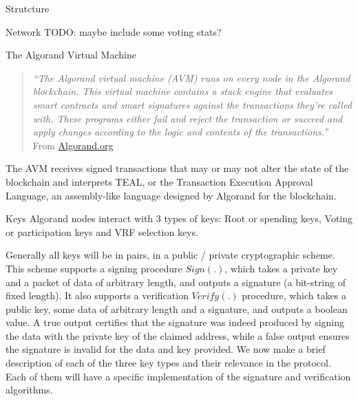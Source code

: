 \documentclass[10pt,a4paper]{article}
\begin{document}
\begin{section}{Strutcture}
\begin{subsection}{Network}
TODO: maybe include some voting stats?

\end{subsection}
\begin{subsection}{The Algorand Virtual Machine}\label{sect:avm}
    
    \begin{quote} 
        {\em``The Algorand virtual machine (AVM) runs on every node in the Algorand blockchain. 
    This virtual machine contains a stack engine that evaluates smart contracts and smart 
    signatures against the transactions they're called with. These programs either fail 
    and reject the transaction or succeed and apply changes according to the logic and 
    contents of the transactions.''} From \href{https://developer.algorand.org/docs/get-details/dapps/avm/}{Algorand.org}
    \end{quote}
    
The AVM receives signed transactions that may or may not alter the 
state of the blockchain and interprets TEAL, or the Transaction Execution 
Approval Language, an assembly-like language designed by Algorand 
for the blockchain.

\end{subsection}
\begin{subsection}{Keys}
    Algorand nodes interact with 3 types of keys:
    Root or spending keys,
    Voting or participation keys and
    VRF selection keys.

    Generally all keys will be in pairs, in a public / private cryptographic scheme.
    This scheme supports a signing procedure $Sign(.)$, which takes a private key and a packet of data of arbitrary length,
    and outputs a signature (a bit-string of fixed length).
    It also supports a verification $Verify(.)$ procedure, which takes a public key, some data of arbitrary length and a signature, 
    and outputs a boolean value.
    A true output certifies that the signature was indeed produced by signing the data with the private key of the 
    claimed address, while a false output ensures the signature is invalid for the data and key provided.
    We now make a brief description of each of the three key types and their relevance in the protocol.
    Each of them will have a specific implementation of the signature and verification algorithms.


\end{subsection}
\end{section}
\end{document}

